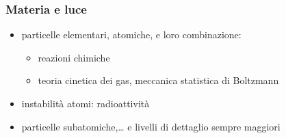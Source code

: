 \documentclass[letterpaper,10pt,italian]{jupyterBook}
\begin{document}
\subsubsection{Materia e luce}
\label{\detokenize{ch/modern:materia-e-luce}}
\sphinxAtStartPar
{}
\begin{itemize}
\item {} 
\sphinxAtStartPar
particelle elementari, atomiche, e loro combinazione:
\begin{itemize}
\item {} 
\sphinxAtStartPar
reazioni chimiche

\item {} 
\sphinxAtStartPar
teoria cinetica dei gas, meccanica statistica di Boltzmann

\end{itemize}

\item {} 
\sphinxAtStartPar
instabilità atomi: radioattività

\item {} 
\sphinxAtStartPar
particelle sub\sphinxhyphen{}atomiche,… e livelli di dettaglio sempre maggiori

\end{itemize}

\sphinxAtStartPar
{}
\end{document}
